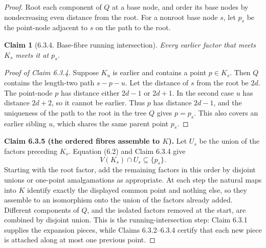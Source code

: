 \documentclass[a4paper,11pt,reqno]{amsart}
\theoremstyle{plain}
\newtheorem*{claim}{Claim}
\theoremstyle{definition}
\theoremstyle{remark}
\begin{document}
\begin{proof}
Root each component of \(Q\) at a base node, and order its base nodes by
nondecreasing even distance from the root. For a nonroot base node \(s\), let
\(p_s\) be the point-node adjacent to \(s\) on the path to the root.

\begin{claim}[6.3.4. Base-fibre running intersection]

Every earlier factor that meets \(K_s\) meets it at \(p_s\).

\end{claim}
\begin{proof}[Proof of Claim 6.3.4]
Suppose \(K_u\) is earlier and contains a point
\(p\in K_s\). Then \(Q\) contains the length-two path \(s-p-u\). Let the
distance of \(s\) from the root be \(2d\). The point-node \(p\) has distance
either \(2d-1\) or \(2d+1\). In the second case \(u\) has distance \(2d+2\),
so it cannot be earlier. Thus \(p\) has distance \(2d-1\), and the uniqueness
of the path to the root in the tree \(Q\) gives \(p=p_s\). This also covers
an earlier sibling \(u\), which shares the same parent point \(p_s\).
\end{proof}

\medskip
\noindent\textbf{Claim 6.3.5 (the ordered fibres assemble to \(K\)).}
Let \(U_s\) be the union of the factors preceding \(K_s\). Equation (6.2)
and Claim 6.3.4 give
\[
V(K_s)\cap U_s\subseteq\{p_s\}.
\]
Starting with the root factor, add the remaining factors in this order by
disjoint unions or one-point amalgamations as appropriate. At each step the
natural maps into \(K\) identify exactly the displayed common point and
nothing else, so they assemble to an isomorphism onto the union of the
factors already added. Different components of \(Q\), and the isolated
factors removed at the start, are combined by disjoint union. This is the
running-intersection step: Claim 6.3.1 supplies the expansion pieces, while
Claims 6.3.2--6.3.4 certify that each new piece is attached along at most one
previous point.
\end{proof}
\end{document}

